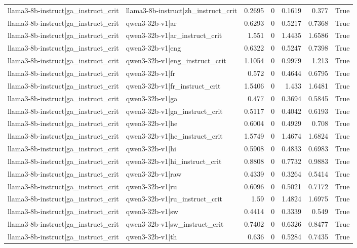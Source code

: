 \begin{table}
\begin{tabular}{l l r r r r l}
llama3-8b-instruct|ga_instruct_crit & llama3-8b-instruct|zh_instruct_crit & 0.2695 & 0 & 0.1619 & 0.377 & True \\
llama3-8b-instruct|ga_instruct_crit & qwen3-32b-v1|ar & 0.6293 & 0 & 0.5217 & 0.7368 & True \\
llama3-8b-instruct|ga_instruct_crit & qwen3-32b-v1|ar_instruct_crit & 1.551 & 0 & 1.4435 & 1.6586 & True \\
llama3-8b-instruct|ga_instruct_crit & qwen3-32b-v1|eng & 0.6322 & 0 & 0.5247 & 0.7398 & True \\
llama3-8b-instruct|ga_instruct_crit & qwen3-32b-v1|eng_instruct_crit & 1.1054 & 0 & 0.9979 & 1.213 & True \\
llama3-8b-instruct|ga_instruct_crit & qwen3-32b-v1|fr & 0.572 & 0 & 0.4644 & 0.6795 & True \\
llama3-8b-instruct|ga_instruct_crit & qwen3-32b-v1|fr_instruct_crit & 1.5406 & 0 & 1.433 & 1.6481 & True \\
llama3-8b-instruct|ga_instruct_crit & qwen3-32b-v1|ga & 0.477 & 0 & 0.3694 & 0.5845 & True \\
llama3-8b-instruct|ga_instruct_crit & qwen3-32b-v1|ga_instruct_crit & 0.5117 & 0 & 0.4042 & 0.6193 & True \\
llama3-8b-instruct|ga_instruct_crit & qwen3-32b-v1|he & 0.6004 & 0 & 0.4929 & 0.708 & True \\
llama3-8b-instruct|ga_instruct_crit & qwen3-32b-v1|he_instruct_crit & 1.5749 & 0 & 1.4674 & 1.6824 & True \\
llama3-8b-instruct|ga_instruct_crit & qwen3-32b-v1|hi & 0.5908 & 0 & 0.4833 & 0.6983 & True \\
llama3-8b-instruct|ga_instruct_crit & qwen3-32b-v1|hi_instruct_crit & 0.8808 & 0 & 0.7732 & 0.9883 & True \\
llama3-8b-instruct|ga_instruct_crit & qwen3-32b-v1|raw & 0.4339 & 0 & 0.3264 & 0.5414 & True \\
llama3-8b-instruct|ga_instruct_crit & qwen3-32b-v1|ru & 0.6096 & 0 & 0.5021 & 0.7172 & True \\
llama3-8b-instruct|ga_instruct_crit & qwen3-32b-v1|ru_instruct_crit & 1.59 & 0 & 1.4824 & 1.6975 & True \\
llama3-8b-instruct|ga_instruct_crit & qwen3-32b-v1|sw & 0.4414 & 0 & 0.3339 & 0.549 & True \\
llama3-8b-instruct|ga_instruct_crit & qwen3-32b-v1|sw_instruct_crit & 0.7402 & 0 & 0.6326 & 0.8477 & True \\
llama3-8b-instruct|ga_instruct_crit & qwen3-32b-v1|th & 0.636 & 0 & 0.5284 & 0.7435 & True \\

\end{tabular}
\end{table}
